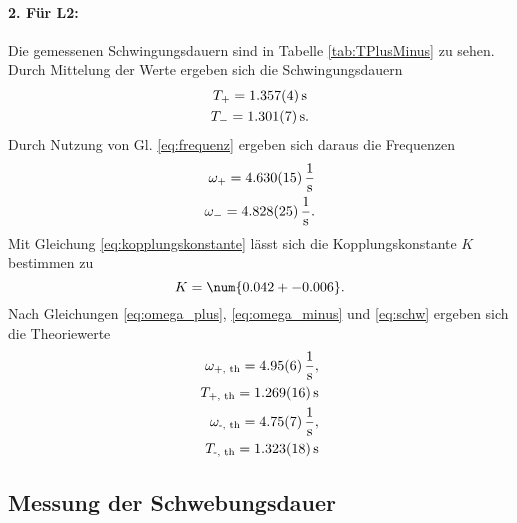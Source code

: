 \paragraph{2. Für L2:}
Die gemessenen Schwingungsdauern sind in Tabelle \ref{tab:TPlusMinus} zu sehen. Durch Mittelung der Werte ergeben sich die Schwingungsdauern
\begin{gather*}
    T_+ = \SI{1.357 +- 0.004}{s} \\
    T_- = \SI{1.301 +- 0.007}{s} .
\end{gather*}
Durch Nutzung von Gl. \eqref{eq:frequenz} ergeben sich daraus die Frequenzen
\begin{align*}
    \omega_+ = \SI{4.630 +- 0.015}{\frac{1}{s}} \\
    \omega_- = \SI{4.828 +- 0.025}{\frac{1}{s}} .
\end{align*}
Mit Gleichung \eqref{eq:kopplungskonstante} lässt sich die Kopplungskonstante $K$ bestimmen zu
\begin{equation*}
    K = \num{0.042 +- 0.006} .
\end{equation*}
Nach Gleichungen \eqref{eq:omega_plus}, \eqref{eq:omega_minus} und \eqref{eq:schw} ergeben sich die Theoriewerte
\begin{align*}
    \omega_\text{+, th} = \SI{4.95 +- 0.06}{\frac{1}{s}} , \\
    T_\text{+, th} = \SI{1.269 +- 0.016}{s} \\
    \omega_\text{-, th} = \SI{4.75 +- 0.07}{\frac{1}{s}} , \\
    T_\text{-, th} = \SI{1.323 +- 0.018}{s} 
\end{align*}
\subsection{Messung der Schwebungsdauer}



